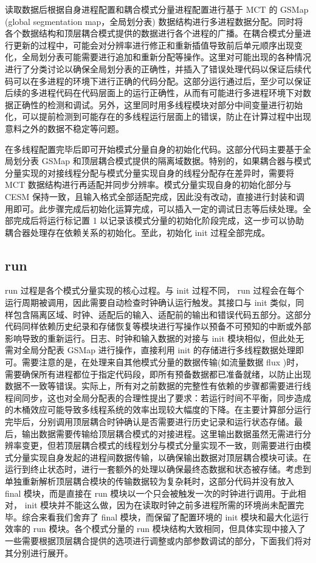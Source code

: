 读取数据后根据自身进程配置和耦合模式分量进程配置进行基于 MCT 的 GSMap (global segmentation map，全局划分表) 数据结构进行多进程数据分配。同时将各个数据结构和顶层耦合模式提供的数据进行各个进程的广播。在耦合模式分量进行更新的过程中，可能会对分辨率进行修正和重新插值导致前后单元顺序出现变化，全局划分表可能需要进行追加和重新分配等操作。这里对可能出现的各种情况进行了分类讨论以确保全局划分表的正确性，并插入了错误处理代码以保证后续代码可以在多进程的环境下进行正确的代码分配。这部分运行通过后，至少可以保证后续的多进程代码在代码层面上的运行正确性，从而有可能进行多进程环境下对数据正确性的检测和调试。另外，这里同时用多线程模块对部分中间变量进行初始化，可以提前检测到可能存在的多线程运行层面上的错误，防止在计算过程中出现意料之外的数据不稳定等问题。

在多线程配置完毕后即可开始模式分量自身的初始化代码。这部分代码主要基于全局划分表 GSMap 和顶层耦合模式提供的隔离域数据。特别的，如果耦合器与模式分量实现的对接线程分配与模式分量实现自身的线程分配存在差异时，需要将 MCT 数据结构进行再适配并同步分辨率。模式分量实现自身的初始化部分与 CESM 保持一致，且输入格式全部适配完成，因此没有改动，直接进行封装和调用即可。此步骤完成后初始化运算完成，可以插入一定的调试日志等后续处理。全部完成后将运行标记置 1 以记录该模式分量的初始化阶段完成，这一步可以协助耦合器处理存在依赖关系的初始化。至此，初始化 init 过程全部完成。

\subsection{run}

run 过程是各个模式分量实现的核心过程。与 init 过程不同， run 过程会在每个运行周期被调用，因此需要自动检查时钟确认运行触发。其接口与 init 类似，同样包含隔离区域、时钟、适配后的输入、适配前的输出和错误代码五部分。这部分代码同样依赖历史纪录和存储恢复等模块进行写操作以预备不可预知的中断或外部影响导致的重新运行。日志、时钟和输入数据的对接与 init 模块相似，但此处无需对全局分配表 GSMap 进行操作，直接利用 init 的存储进行多线程数据处理即可。需要注意的是，在处理来自其他模式分量的数据传输(如流量数据 flux )时，需要确保所有进程都位于指定代码段，即所有预备数据都已准备就绪，以防止出现数据不一致等错误。实际上，所有对之前数据的完整性有依赖的步骤都需要进行线程间同步，这也对全局分配表的合理性提出了要求：若运行时间不平衡，同步造成的木桶效应可能导致多线程系统的效率出现较大幅度的下降。在主要计算部分运行完毕后，分别调用顶层耦合时钟确认是否需要进行历史记录和运行状态存储。最后，输出数据需要传输给顶层耦合模式的对接进程。这里输出数据虽然无需进行分辨率变更，但若顶层耦合模式的线程划分与模式分量实现不一致，则需要进行由模式分量实现自身发起的进程间数据传输，以确保输出数据对顶层耦合模块可读。在运行到终止状态时，进行一套额外的处理以确保最终态数据和状态被存储。考虑到单独重新解析顶层耦合模块的传输数据较为复杂耗时，这部分代码并没有放入 final 模块，而是直接在 run 模块以一个只会被触发一次的时钟进行调用。于此相对， init 模块并不能这么做，因为在读取时钟之前多进程所需的环境尚未配置完毕。综合来看我们舍弃了 final 模块，而保留了配置环境的 init 模块和最大化运行效率的 run 模块。各个模式分量的 run 模块结构大致相同，但具体实现中接入了一些需要根据顶层耦合提供的选项进行调整或内部参数调试的部分，下面我们将对其分别进行展开。


